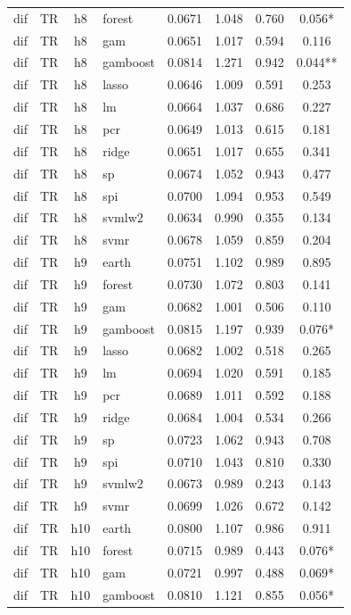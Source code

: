 \begin{ThreePartTable}
\begin{longtable}[t]{llclcccc}
dif & TR & h8 & forest & 0.0671 & 1.048 & 0.760 & 0.056*\\
dif & TR & h8 & gam & 0.0651 & 1.017 & 0.594 & 0.116\\
dif & TR & h8 & gamboost & 0.0814 & 1.271 & 0.942 & 0.044**\\
dif & TR & h8 & lasso & 0.0646 & 1.009 & 0.591 & 0.253\\
dif & TR & h8 & lm & 0.0664 & 1.037 & 0.686 & 0.227\\
dif & TR & h8 & pcr & 0.0649 & 1.013 & 0.615 & 0.181\\
dif & TR & h8 & ridge & 0.0651 & 1.017 & 0.655 & 0.341\\
dif & TR & h8 & sp & 0.0674 & 1.052 & 0.943 & 0.477\\
dif & TR & h8 & spi & 0.0700 & 1.094 & 0.953 & 0.549\\
dif & TR & h8 & svmlw2 & 0.0634 & 0.990 & 0.355 & 0.134\\
dif & TR & h8 & svmr & 0.0678 & 1.059 & 0.859 & 0.204\\
\addlinespace
dif & TR & h9 & earth & 0.0751 & 1.102 & 0.989 & 0.895\\
dif & TR & h9 & forest & 0.0730 & 1.072 & 0.803 & 0.141\\
dif & TR & h9 & gam & 0.0682 & 1.001 & 0.506 & 0.110\\
dif & TR & h9 & gamboost & 0.0815 & 1.197 & 0.939 & 0.076*\\
dif & TR & h9 & lasso & 0.0682 & 1.002 & 0.518 & 0.265\\
dif & TR & h9 & lm & 0.0694 & 1.020 & 0.591 & 0.185\\
dif & TR & h9 & pcr & 0.0689 & 1.011 & 0.592 & 0.188\\
dif & TR & h9 & ridge & 0.0684 & 1.004 & 0.534 & 0.266\\
dif & TR & h9 & sp & 0.0723 & 1.062 & 0.943 & 0.708\\
dif & TR & h9 & spi & 0.0710 & 1.043 & 0.810 & 0.330\\
dif & TR & h9 & svmlw2 & 0.0673 & 0.989 & 0.243 & 0.143\\
dif & TR & h9 & svmr & 0.0699 & 1.026 & 0.672 & 0.142\\
\addlinespace
dif & TR & h10 & earth & 0.0800 & 1.107 & 0.986 & 0.911\\
dif & TR & h10 & forest & 0.0715 & 0.989 & 0.443 & 0.076*\\
dif & TR & h10 & gam & 0.0721 & 0.997 & 0.488 & 0.069*\\
dif & TR & h10 & gamboost & 0.0810 & 1.121 & 0.855 & 0.056*\\

\end{longtable}
\end{ThreePartTable}
